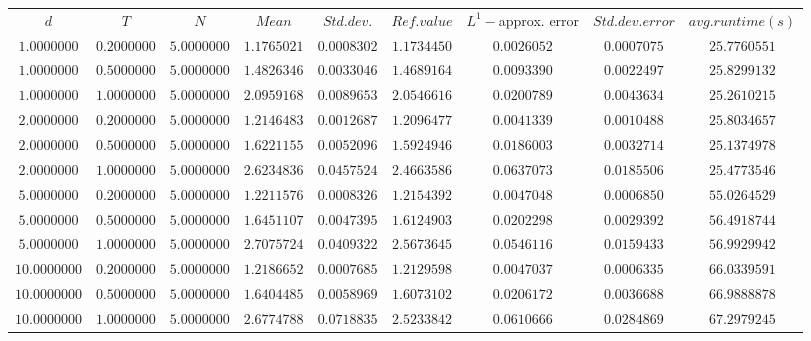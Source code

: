 \begin{tabular}{ccccccccc}
$d$ & $T$ & $N$ & $Mean$ & $Std. dev.$ & $Ref. value$ & $L^1-$approx. error & $Std. dev. error$ & $avg. runtime (s)$\\
$1.0000000$ & $0.2000000$ & $5.0000000$ & $1.1765021$ & $0.0008302$ & $1.1734450$ & $0.0026052$ & $0.0007075$ & $25.7760551$\\
$1.0000000$ & $0.5000000$ & $5.0000000$ & $1.4826346$ & $0.0033046$ & $1.4689164$ & $0.0093390$ & $0.0022497$ & $25.8299132$\\
$1.0000000$ & $1.0000000$ & $5.0000000$ & $2.0959168$ & $0.0089653$ & $2.0546616$ & $0.0200789$ & $0.0043634$ & $25.2610215$\\
$2.0000000$ & $0.2000000$ & $5.0000000$ & $1.2146483$ & $0.0012687$ & $1.2096477$ & $0.0041339$ & $0.0010488$ & $25.8034657$\\
$2.0000000$ & $0.5000000$ & $5.0000000$ & $1.6221155$ & $0.0052096$ & $1.5924946$ & $0.0186003$ & $0.0032714$ & $25.1374978$\\
$2.0000000$ & $1.0000000$ & $5.0000000$ & $2.6234836$ & $0.0457524$ & $2.4663586$ & $0.0637073$ & $0.0185506$ & $25.4773546$\\
$5.0000000$ & $0.2000000$ & $5.0000000$ & $1.2211576$ & $0.0008326$ & $1.2154392$ & $0.0047048$ & $0.0006850$ & $55.0264529$\\
$5.0000000$ & $0.5000000$ & $5.0000000$ & $1.6451107$ & $0.0047395$ & $1.6124903$ & $0.0202298$ & $0.0029392$ & $56.4918744$\\
$5.0000000$ & $1.0000000$ & $5.0000000$ & $2.7075724$ & $0.0409322$ & $2.5673645$ & $0.0546116$ & $0.0159433$ & $56.9929942$\\
$10.0000000$ & $0.2000000$ & $5.0000000$ & $1.2186652$ & $0.0007685$ & $1.2129598$ & $0.0047037$ & $0.0006335$ & $66.0339591$\\
$10.0000000$ & $0.5000000$ & $5.0000000$ & $1.6404485$ & $0.0058969$ & $1.6073102$ & $0.0206172$ & $0.0036688$ & $66.9888878$\\
$10.0000000$ & $1.0000000$ & $5.0000000$ & $2.6774788$ & $0.0718835$ & $2.5233842$ & $0.0610666$ & $0.0284869$ & $67.2979245$\\
\end{tabular}
